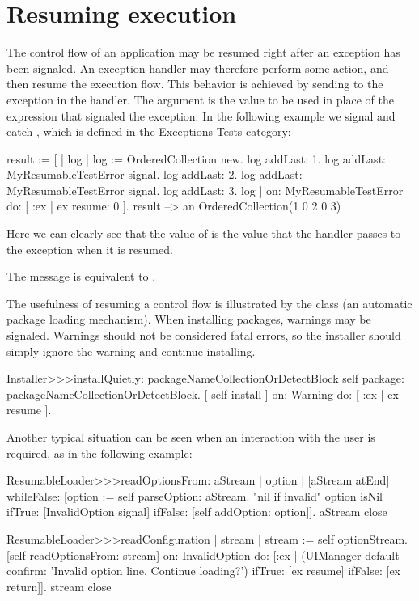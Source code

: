 \documentclass[a4paper,10pt,twoside]{book}
\begin{document}
\section{Resuming execution}

The control flow of an application may be resumed right after an exception has been signaled. An exception handler may therefore perform some action, and then resume the execution flow. This behavior is achieved by sending  to the exception in the handler.
The argument is the value to be used in place of the expression that signaled the exception.
In the following example we signal and catch , which is defined in the Exceptions-Tests category:

\begin{code}{}
result := [ | log |
	log := OrderedCollection new.
	log addLast: 1.
	log addLast: MyResumableTestError signal. 
	log addLast: 2.
	log addLast: MyResumableTestError signal.
	log addLast: 3.
	log ] 
		on: MyResumableTestError 
		do: [ :ex |  ex resume: 0 ].
result --> an OrderedCollection(1 0 2 0 3)
\end{code}
Here we can clearly see that the value of  is the value that the handler passes to the exception when it is resumed.

The message  is equivalent to .

The usefulness of resuming a control flow is illustrated by the class  (an automatic package loading mechanism). When installing packages, warnings may be signaled. Warnings should not be considered fatal errors, so the installer should simply ignore the warning and continue installing.

\begin{code}{}
Installer>>>installQuietly: packageNameCollectionOrDetectBlock 
	self package: packageNameCollectionOrDetectBlock. 
	 [ self install ] on: Warning do: [ :ex | ex resume ]. 
\end{code}


Another typical situation can be seen when an interaction with the user is required, as in the following example:
\begin{code}{}
ResumableLoader>>>readOptionsFrom: aStream 
	| option |
	[aStream atEnd]
		whileFalse: [option := self parseOption: aStream.
			"nil if invalid"
			option isNil
				ifTrue: [InvalidOption signal]
				ifFalse: [self addOption: option]].
	aStream close

ResumableLoader>>>readConfiguration
	| stream |
	stream := self optionStream.
	[self readOptionsFrom: stream]
		on: InvalidOption
		do: [:ex | (UIManager default confirm: 'Invalid option line. Continue loading?')
				ifTrue: [ex resume]
				ifFalse: [ex return]].
	stream close
\end{code}
\end{document}
